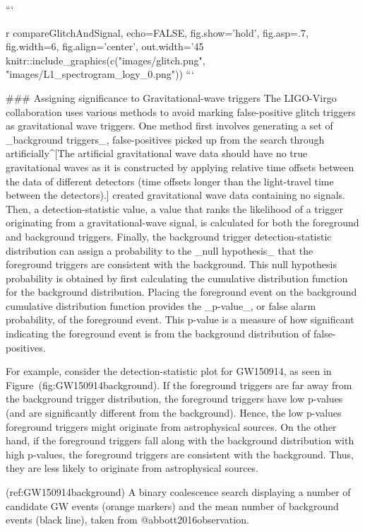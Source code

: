 ```{r compareGlitchAndSignal, echo=FALSE, fig.show='hold', fig.asp=.7, fig.width=6, fig.align='center', out.width='45%
knitr::include_graphics(c("images/glitch.png", "images/L1_spectrogram_logy_0.png"))
```


### Assigning significance to Gravitational-wave triggers
The LIGO-Virgo collaboration uses various methods to avoid marking false-positive glitch triggers as gravitational wave
triggers. One method first involves generating a set of _background triggers_, false-positives picked up from the search
through artificially^[The artificial gravitational wave data
should have no true gravitational waves as it is constructed by applying relative time offsets between the data of different detectors (time offsets longer than the light-travel time between the detectors).] created gravitational
wave data containing no signals. Then, a detection-statistic value, a value
that ranks the likelihood of a trigger originating from a gravitational-wave signal,  is calculated for both the
foreground and background triggers. Finally, the background trigger detection-statistic distribution can assign a probability to the _null hypothesis_ that the foreground triggers are consistent with the background. This null hypothesis probability is obtained by first calculating the cumulative distribution function for the background distribution. Placing the foreground event on the background cumulative distribution function provides the  _p-value_, or false alarm probability, of the foreground event. This p-value is a measure of how significant indicating the foreground event is from the background distribution of false-positives. 

For example, consider the
detection-statistic plot for GW150914, as seen in Figure~\@ref(fig:GW150914background). If the
foreground triggers are far away from the background trigger distribution, the foreground triggers have low p-values (and are significantly
different from the background). Hence, the low p-values foreground triggers might originate from astrophysical sources. On the other hand, if the foreground
triggers fall along with the background distribution with high p-values, the foreground triggers are consistent with the background. Thus,
they are less likely to originate from astrophysical sources.  

(ref:GW150914background) A binary coalescence search displaying a number of candidate GW events (orange markers) and the mean number of background events (black line), taken from @abbott2016observation.

}
